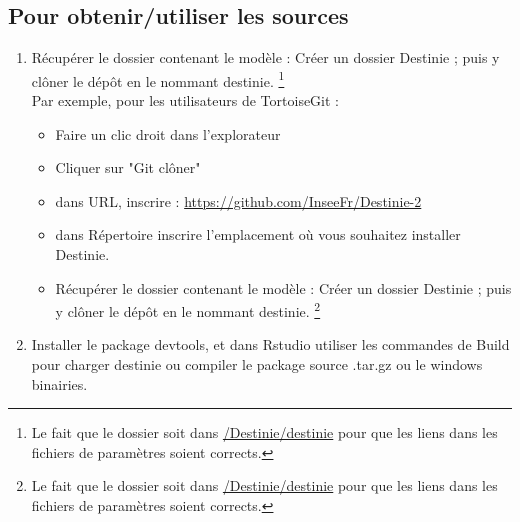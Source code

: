 \subsection{Pour obtenir/utiliser les sources}

\begin{enumerate}
\item Récupérer le dossier contenant le modèle : 
Créer un dossier Destinie ; puis y clôner le dépôt en le nommant destinie. \footnote{Le fait que le dossier soit dans \url{/Destinie/destinie} pour que les liens dans les fichiers de paramètres soient corrects.} \\
Par exemple, pour les utilisateurs de TortoiseGit :
\begin{itemize}
\item Faire un clic droit dans l'explorateur
\item Cliquer sur "Git clôner"
\item  dans URL, inscrire : \url{https://github.com/InseeFr/Destinie-2}
\item dans Répertoire inscrire l'emplacement où vous souhaitez installer Destinie. \item Récupérer le dossier contenant le modèle : 
Créer un dossier Destinie ; puis y clôner le dépôt en le nommant destinie. \footnote{Le fait que le dossier soit dans \url{/Destinie/destinie} pour que les liens dans les fichiers de paramètres soient corrects.} \\
\end{itemize}
% 
 
 \item  Installer le package devtools, et dans Rstudio utiliser les commandes de Build pour charger destinie ou compiler le package source .tar.gz ou le windows binairies. 
\end{enumerate}




